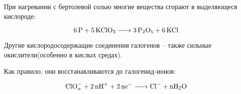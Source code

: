 При нагревании с бертолевой солью многие вещества сгорают в выделяющеся кислороде:

\begin{equation}
    \ce{6P + 5KClO3 -> 3P2O5 + 6 KCl}
\end{equation}

Другие кислородосодержащие соединения галогенов -- также сильные окислители(особенно в кислых средах).

Как правило, они восстанавливаются до галогенид-ионов:

\begin{equation}
\ce{ClO^{-}_n + 2nH^{+} + 2ne- -> Cl- +nH2O}
\end{equation}